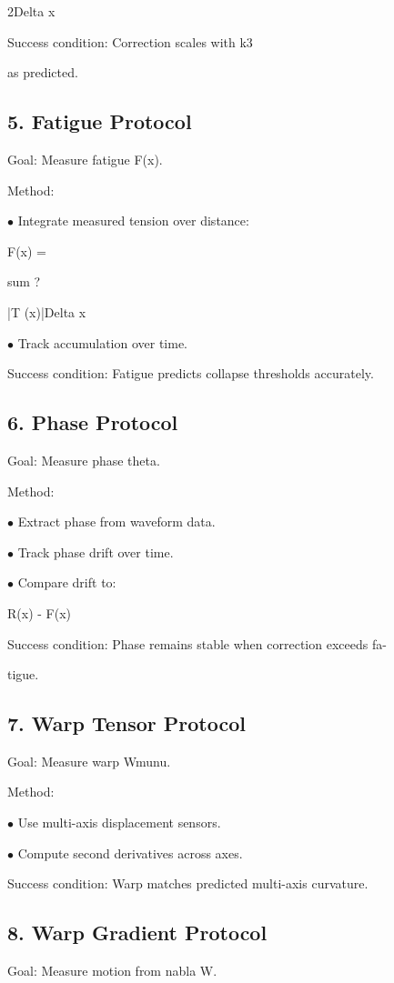 \documentclass[10pt]{article}
\begin{document}
2Delta x

Success condition: Correction scales with k3

as predicted.

\subsection*{5. Fatigue Protocol}
Goal: Measure fatigue F(x).

Method:

\noindent $\bullet$ Integrate measured tension over distance:

F(x) =

sum ?

|T (x)|Delta x

\noindent $\bullet$ Track accumulation over time.

Success condition: Fatigue predicts collapse thresholds accurately.


\subsection*{6. Phase Protocol}
Goal: Measure phase theta.

Method:

\noindent $\bullet$ Extract phase from waveform data.

\noindent $\bullet$ Track phase drift over time.

\noindent $\bullet$ Compare drift to:

R(x) - F(x)

Success condition: Phase remains stable when correction exceeds fa-

tigue.

\subsection*{7. Warp Tensor Protocol}
Goal: Measure warp Wmunu.

Method:

\noindent $\bullet$ Use multi-axis displacement sensors.

\noindent $\bullet$ Compute second derivatives across axes.

Success condition: Warp matches predicted multi-axis curvature.

\subsection*{8. Warp Gradient Protocol}
Goal: Measure motion from nabla W.
\end{document}
